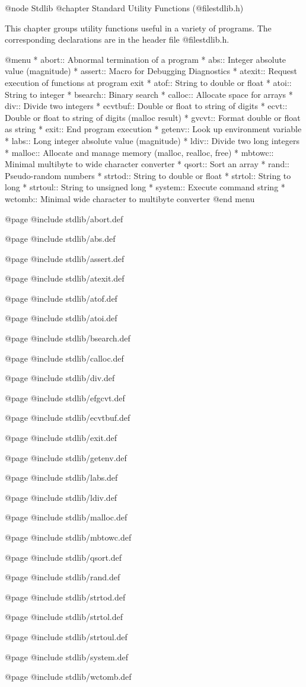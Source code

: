 @node Stdlib
@chapter Standard Utility Functions (@file{stdlib.h})

This chapter groups utility functions useful in a variety of programs.
The corresponding declarations are in the header file @file{stdlib.h}.

@menu 
* abort::       Abnormal termination of a program
* abs::         Integer absolute value (magnitude)
* assert::      Macro for Debugging Diagnostics
* atexit::      Request execution of functions at program exit
* atof::        String to double or float
* atoi::        String to integer
* bsearch::     Binary search
* calloc::      Allocate space for arrays
* div::         Divide two integers
* ecvtbuf::     Double or float to string of digits
* ecvt::        Double or float to string of digits (malloc result)
* gvcvt::       Format double or float as string
* exit::        End program execution
* getenv::      Look up environment variable
* labs::        Long integer absolute value (magnitude)
* ldiv::        Divide two long integers
* malloc::      Allocate and manage memory (malloc, realloc, free)
* mbtowc::      Minimal multibyte to wide character converter
* qsort::       Sort an array
* rand::        Pseudo-random numbers
* strtod::      String to double or float
* strtol::      String to long
* strtoul::     String to unsigned long
* system::      Execute command string
* wctomb::      Minimal wide character to multibyte converter
@end menu

@page
@include stdlib/abort.def

@page
@include stdlib/abs.def

@page
@include stdlib/assert.def

@page
@include stdlib/atexit.def

@page
@include stdlib/atof.def

@page
@include stdlib/atoi.def

@page
@include stdlib/bsearch.def

@page
@include stdlib/calloc.def

@page
@include stdlib/div.def

@page
@include stdlib/efgcvt.def

@page
@include stdlib/ecvtbuf.def

@page
@include stdlib/exit.def

@page
@include stdlib/getenv.def

@page
@include stdlib/labs.def

@page
@include stdlib/ldiv.def

@page
@include stdlib/malloc.def

@page
@include stdlib/mbtowc.def

@page
@include stdlib/qsort.def

@page
@include stdlib/rand.def

@page
@include stdlib/strtod.def

@page
@include stdlib/strtol.def

@page
@include stdlib/strtoul.def

@page
@include stdlib/system.def

@page
@include stdlib/wctomb.def
